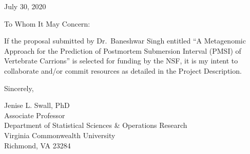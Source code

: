 \documentclass[12pt]{article}
\begin{document}
\pagestyle{empty}

\vspace*{0.5in}

\noindent July 30, 2020

\vspace*{1.5in}




\noindent To Whom It May Concern:

\vspace{0.2in}

\noindent If the proposal submitted by Dr.\ Baneshwar Singh entitled
``A Metagenomic Approach for the Prediction of Postmortem Submersion Interval
(PMSI) of Vertebrate Carrions'' is selected for funding by the NSF, it is my
intent to collaborate and/or commit resources as detailed in the Project
Description.

\vspace*{0.3in}

\noindent Sincerely,

\vspace*{0.5in}

\noindent Jenise L. Swall, PhD\\
\noindent Associate Professor\\
\noindent Department of Statistical Sciences \& Operations Research\\
\noindent Virginia Commonwealth University\\
\noindent Richmond, VA 23284
\end{document}
